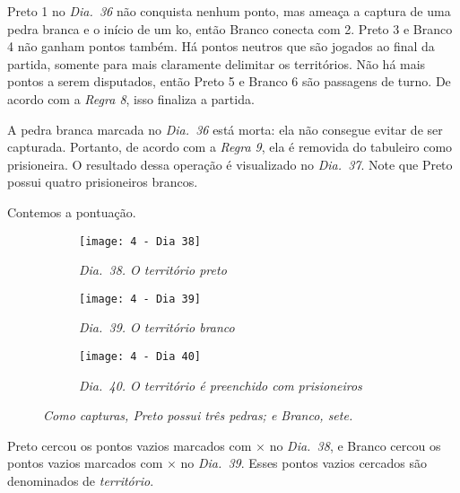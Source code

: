 Preto 1 no \emph{Dia.\@~36} não conquista nenhum ponto, mas ameaça a captura de uma pedra branca e o início de um ko, então Branco conecta com 2. Preto 3 e Branco 4 não ganham pontos também. Há pontos neutros que são jogados ao final da partida, somente para mais claramente delimitar os territórios. Não há mais pontos a serem disputados, então Preto 5 e Branco 6 são passagens de turno. De acordo com a \emph{Regra 8}, isso finaliza a partida.

A pedra branca marcada no \emph{Dia.\@~36} está morta: ela não consegue evitar de ser capturada. Portanto, de acordo com a \emph{Regra 9}, ela é removida do tabuleiro como prisioneira. O resultado dessa operação é visualizado no \emph{Dia.\@~37}. Note que Preto possui quatro prisioneiros brancos.

Contemos a pontuação.

\pagebreak

\begin{figure}[h!]
    \centering
    \begin{subfigure}[t]{.3\textwidth}
        \centering
        \texttt{[image: 4 - Dia 38]}
        \caption*{\emph{Dia.\@~38. O território preto}}
    \end{subfigure}
    \hfill
    \begin{subfigure}[t]{.3\textwidth}
        \centering
        \texttt{[image: 4 - Dia 39]}
        \caption*{\emph{Dia.\@~39. O território branco}}
    \end{subfigure}
    \hfill
    \begin{subfigure}[t]{.3\textwidth}
        \centering
        \texttt{[image: 4 - Dia 40]}
        \caption*{\emph{Dia.\@~40. O território é preenchido com prisioneiros}}
    \end{subfigure}
    \vspace*{.5cm}
    \caption*{\emph{Como capturas, Preto possui três pedras; e Branco, sete.}}
\end{figure}

Preto cercou os pontos vazios marcados com $\times$ no \emph{Dia.\@~38}, e Branco cercou os pontos vazios marcados com $\times$ no \emph{Dia.\@~39}. Esses pontos vazios cercados são denominados de \emph{território}.

